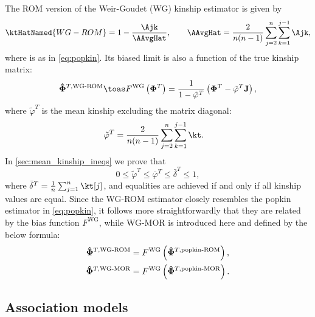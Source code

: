 \documentclass[11pt]{article}
\newcommand{\kinMat}[1][T]{%
  \ensuremath{%
    \mathbf{\Phi}^{#1}
  }%
  \xspace%
}%
\newcommand{\kinMatEstNamed}[1]{%
  \ensuremath{%
    \mathbf{\hat{\Phi}}^{T,\text{#1}}
  }%
  \xspace%
}%
\begin{document}
The ROM version of the Weir-Goudet (WG) kinship estimator is given by \citep{weir_unified_2017, ochoa_estimating_2021}
\begin{equation}
  \label{eq:wg}
  \ktHatNamed{WG-ROM}
  =
  1 - \frac{\Ajk}{\AAvgHat}
  , \quad\quad
  \AAvgHat
  =
  \frac{2}{n(n-1)}
  \sum_{j=2}^n
  \sum_{k=1}^{j-1}
    \Ajk
    ,
\end{equation}
where \Ajk is as in \cref{eq:popkin}.
Its biased limit is also a function of the true kinship matrix:
\begin{equation}
  \label{eq:wg_lim}
  \kinMatEstNamed{WG-ROM}
  \toas
  F^\text{WG} \left( \kinMat \right)
  =
  \frac{1}{1 - \tilde{\varphi}^T}
  \left( \kinMat - \tilde{\varphi}^T \mathbf{J} \right)
  ,
\end{equation}
where $\tilde{\varphi}^T$ is the mean kinship excluding the matrix diagonal:
\begin{equation}
  \label{eq:wg_tilde}
  \begin{split}
    \tilde{\varphi}^T
    &=
    \frac{2}{n(n-1)}
    \sum_{j=2}^n
    \sum_{k=1}^{j-1}
    \kt
    .
  \end{split}
\end{equation}
In \cref{sec:mean_kinship_ineqs} we prove that
$$
0 \le \tilde{\varphi}^T \le \bar{\varphi}^T \le \bar{\delta}^T \le 1,
$$
where $\bar{\delta}^T = \frac{1}{n} \sum_{j=1}^n \kt[j]$, and equalities are achieved if and only if all kinship values are equal.
Since the WG-ROM estimator closely resembles the popkin estimator in \cref{eq:popkin}, it follows more straightforwardly that they are related by the bias function $F^\text{WG}$, while WG-MOR is introduced here and defined by the below formula:
\begin{align*}
  \kinMatEstNamed{WG-ROM}
  &=
    F^\text{WG} \left( \kinMatEstNamed{popkin-ROM} \right)
    , \\
  \kinMatEstNamed{WG-MOR}
  &=
    F^\text{WG} \left( \kinMatEstNamed{popkin-MOR} \right)
  .
\end{align*}

\subsection{Association models}
\end{document}
